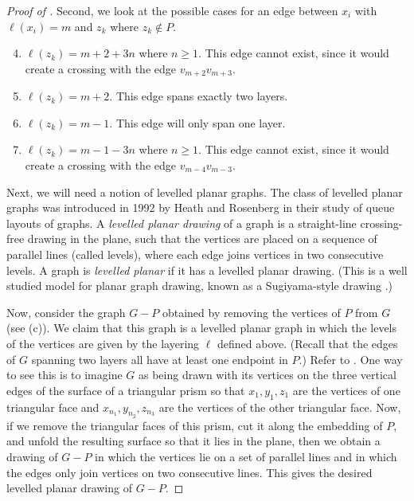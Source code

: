 \documentclass{patmorin}
\begin{document}
\begin{proof}[Proof of ]
  Second, we look at the possible cases for an edge between $x_i$ with $\ell(x_i) = m$ and $z_k$ where $z_k \notin P$.
 \begin{enumerate}
  \setcounter{enumi}{3}
  	\item $\ell(z_k) = m+2+3n$ where $n \geq 1$. This edge cannot exist, since it would create a crossing with the edge $v_{m+2}v_{m+3}$.
  	\item$\ell(z_k) =  m+2$. This edge spans exactly two layers.
  	\item$\ell(z_k) =  m-1$. This edge will only span one layer.
  	\item $\ell(z_k) =  m-1-3n$ where $n \geq 1$. This edge cannot exist, since it would create a crossing with the edge $v_{m-4}v_{m-3}$.
  \end{enumerate}


  Next, we will need a notion of levelled planar graphs. The class of levelled
  planar graphs was introduced in 1992 by Heath and Rosenberg
  \cite{HR-SJC92} in their study of queue layouts of graphs. A \emph{levelled
  planar drawing} of a graph is a straight-line crossing-free drawing in
  the plane, such that the vertices are placed on a sequence of parallel
  lines (called levels), where each edge joins vertices in two
  consecutive levels. A graph is \emph{levelled planar} if it has a levelled
  planar drawing. (This is a well studied model for planar
  graph drawing, known as a Sugiyama-style drawing \cite{STT81,BM2001,HN2013,BETT99}.)

  Now, consider the graph $G-P$ obtained by removing the vertices of $P$
  from $G$ (see (c)).  We claim that this graph is a levelled
  planar graph in which the levels
  of the vertices are given by the layering $\ell$ defined above. (Recall that the edges of $G$ spanning two layers all have at least one endpoint in $P$.)
  Refer to . One way to see this is to imagine $G$
  as being drawn with its vertices on the three vertical edges of the surface of
  a triangular prism so that $x_1,y_1,z_1$ are the vertices of one
  triangular face and $x_{n_1},y_{n_2},z_{n_3}$ are the vertices of
  the other triangular face.  Now, if we remove the triangular faces
  of this prism, cut it along the embedding of $P$, and unfold
  the resulting surface so that it lies in the plane, then we obtain a
  drawing of $G-P$ in which the vertices lie on a set of parallel lines
  and in which the edges only join vertices on two consecutive lines.
  This gives the desired levelled planar drawing of $G-P$.


\end{proof}
\end{document}
